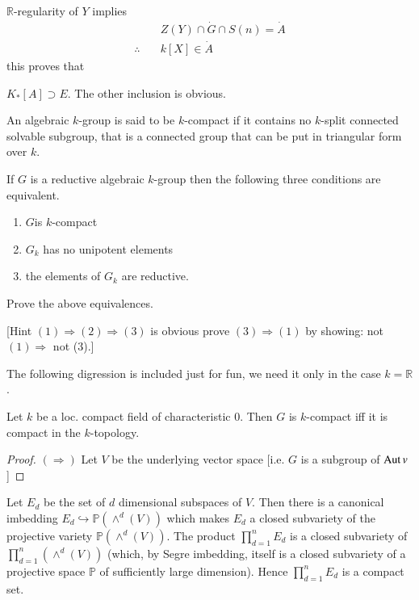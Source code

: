 $\mathbb{R}$-regularity of $Y$ implies
\begin{align*}
  & Z(Y) \cap \dot{G} \cap S(n) = \dot{A}\\
  \therefore \quad  &k [X] \in  \dot{A}
\end{align*}
this proves that
\begin{center}
  $K_* [A]\supset E$. The other inclusion is obvious.
\end{center}

\begin{defi*}
  An algebraic $k$-group is said to be $k$-compact if it contains no
  $k$-split connected solvable subgroup, that is a connected group
  that can be put in triangular form over $k$.
\end{defi*}

\begin{remark*}
  If $G$ is a reductive algebraic $k$-group then the following three
  conditions are equivalent.
  \begin{enumerate}
    \item $G$\pageoriginale is $k$-compact
      \item $G_k$ has no unipotent elements
        \item the elements of $G_k$ are reductive.
  \end{enumerate}
\end{remark*}

\begin{exr}
  Prove the above equivalences.

  [Hint $(1) \Rightarrow (2) \Rightarrow (3)$ is obvious prove $(3)
    \Rightarrow (1)$ by showing: not $(1) \Rightarrow$ not (3).]
\end{exr}

The following digression is included just for fun, we need it only in
the case $k=\mathbb{R}$.

\begin{thm}\label{chap1:thm1.7} %
  Let $k$ be a loc. compact field of characteristic 0. Then $G$ is
  $k$-compact iff it is compact in the $k$-topology.
\end{thm}

\begin{proof}
  $(\Rightarrow)$ Let $V$ be the underlying vector space [i.e. $G$ is
    a subgroup of $\operatorname{Aut} v$]
\end{proof}

Let $E_d$ be the set of $d$ dimensional subspaces of $V$. Then there
is a canonical imbedding $E_d \hookrightarrow \mathbb{P} (\wedge^d
(V))$ which makes $E_d$ a closed subvariety of the projective variety
$\mathbb{P} (\wedge^d (V))$. The product $\displaystyle{\prod^n_{d=1}}
E_d$ is a closed subvariety of $\displaystyle{\prod^n_{d=1} (\wedge^d
  (V))}$ (which, by Segre imbedding, itself is a closed subvariety of
a projective space $\mathbb{P}$ of sufficiently large
dimension). Hence $\displaystyle{\prod^n_{d=1} E_d}$ is a compact set.

